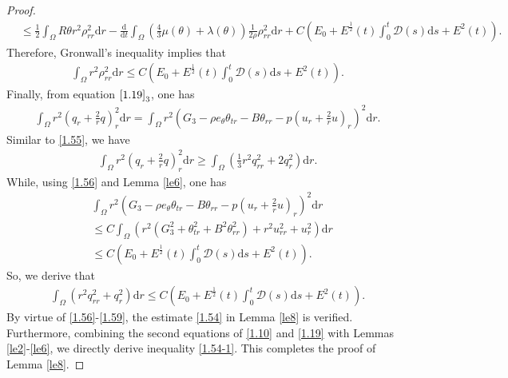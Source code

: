 \documentclass[11pt,reqno]{amsart}
\numberwithin{equation}{section}
\newcommand{\dif}{\mathrm{d}}
\begin{document}
\begin{proof}
{\begin{align*}
&\le \frac{1}{2}\int_{\Omega}  R\theta r^2 \rho_{rr}^2 \dif r- \frac{\dif}{\dif t}\int_{\Omega}  \left(\frac{4}{3}\mu(\theta)+\lambda(\theta)\right)\frac{1}{2\rho} \rho_{rr}^2 \dif r+C(E_0+E^\frac{1}{2}(t) \int_0^t  \mathcal D(s)\dif s+E^2(t)).
\end{align*}}
Therefore, Gronwall's inequality implies that
\begin{align}
\int_{\Omega} r^2 \rho_{rr}^2 \dif r \le C(E_0+E^\frac{1}{2}(t) \int_0^t  \mathcal D(s)\dif s+E^2(t)).
\end{align}
Finally, from equation $\eqref{1.19}_3$, one has
\begin{align} \label{1.58}
\int_{\Omega} r^2 \left(q_r+\frac{2}{r} q\right)_r^2 \dif r =\int_{\Omega} r^2 \left(G_3-\rho e_\theta \theta_{tr}-B \theta_{rr}-p\left(u_r+\frac{2}{r}u\right)_r \right)^2 \dif r.
\end{align}
Similar to \eqref{1.55}, we have
\begin{align*}
\int_{\Omega} r^2 \left(q_r+\frac{2}{r} q\right)_r^2 \dif r \ge \int_{\Omega} (\frac{1}{3} r^2 q_{rr}^2+2q_r^2) \dif r.
\end{align*}
 While, using \eqref{1.56} and Lemma \ref{le6}, one has
 \begin{align*}
& \int_{\Omega} r^2 \left(G_3-\rho e_\theta \theta_{tr}-B \theta_{rr}-p\left(u_r+\frac{2}{r}u\right)_r \right)^2 \dif r\\
& \le C\int_{\Omega} \left(r^2(G_3^2+\theta_{tr}^2+B^2\theta_{rr}^2)+r^2 u_{rr}^2+u_r^2\right)\dif r \\
& \le  C(E_0+E^\frac{1}{2}(t) \int_0^t  \mathcal D(s)\dif s+E^2(t)).
 \end{align*}
So, we derive that
\begin{align}\label{1.59}
\int_{\Omega} ( r^2 q_{rr}^2+q_r^2) \dif r \le C(E_0+E^\frac{1}{2}(t) \int_0^t  \mathcal D(s)\dif s+E^2(t)).
\end{align}
By virtue of \eqref{1.56}-\eqref{1.59}, the estimate \eqref{1.54} in Lemma \ref{le8} is verified. Furthermore, combining the second equations of \eqref{1.10} and \eqref{1.19} with Lemmas \ref{le2}-\ref{le6}, we directly derive inequality \eqref{1.54-1}. This completes the proof of Lemma \ref{le8}.
\end{proof}
\end{document}
